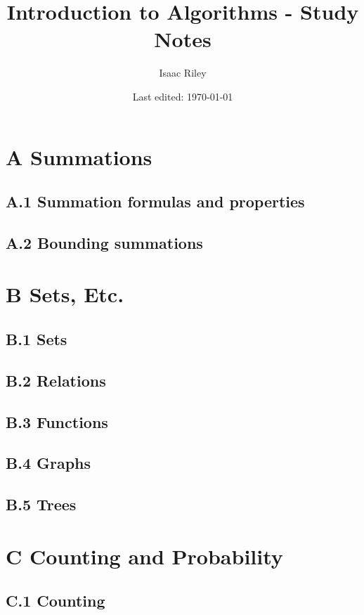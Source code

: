 \documentclass[a4paper]{article}
\title{Introduction to Algorithms - Study Notes}
\author{Isaac Riley}
\date{Last edited: \today}
\begin{document}
\maketitle
\tableofcontents
\newpage




\section*{A Summations}
\subsection*{A.1 Summation formulas and properties}
\subsection*{A.2 Bounding summations}

\newpage
\section*{B Sets, Etc.}
\subsection*{B.1 Sets}
\subsection*{B.2 Relations}
\subsection*{B.3 Functions}
\subsection*{B.4 Graphs}
\subsection*{B.5 Trees}

\newpage
\section*{C Counting and Probability}
\subsection*{C.1 Counting}
\end{document}
